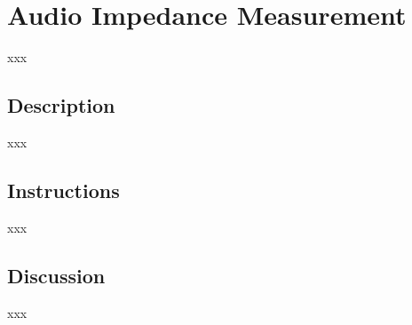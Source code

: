 \section{Audio Impedance Measurement}
xxx
\subsection{Description}
xxx
\subsection{Instructions}
xxx
\subsection{Discussion}
xxx